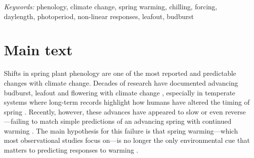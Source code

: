 \documentclass[11pt,letter]{article}
\begin{document}

\noindent \emph{Keywords:} phenology, climate change, spring warming, chilling, forcing, daylength, photoperiod, non-linear responses, leafout, budburst\\

\newpage
\linenumbers
\section{Main text} %
Shifts in spring plant phenology are one of the most reported and predictable changes with climate change. Decades of research have documented advancing budburst, leafout and flowering with climate change \citep{delpierre2009, yu2010,Ellwood2012,jochner2013,hereford2017}, especially in temperate systems where long-term records highlight how humans have altered the timing of spring \citep{Schwartz:1997nn,Menzel2003a,menzel2006}. Recently, however, these advances have appeared to slow \citep{fu2015} or even reverse \citep{yu2010}---failing to match simple predictions of an advancing spring with continued warming \citep{Ellwood2012}. The main hypothesis for this failure is that spring warming---which most observational studies focus on---is no longer the only environmental cue that matters to predicting responses to warming \citep{chuine2016,gauzere2019}.\\
\end{document}
